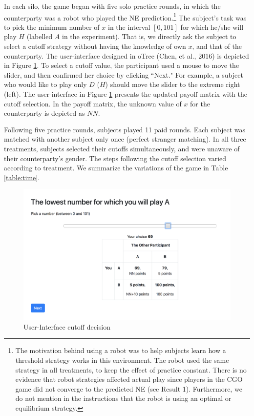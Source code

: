 \documentclass[12pt, letterpaper]{article}
\theoremstyle{plain}
\begin{document}
In each silo, the game began with five solo practice rounds, in which the counterparty was a robot who played the NE prediction.\footnote{The motivation behind using a robot was to help subjects learn how a threshold strategy works in this environment. The robot used the same strategy in all treatments, to keep the effect of practice constant. There is no evidence that robot strategies affected actual play since players in the CGO game did not converge to the predicted NE (see Result 1). Furthermore, we do not mention in the instructions that the robot is using an optimal or equilibrium strategy.} The subject's task was to pick the minimum number of $x$ in the interval $[0,101]$ for which he/she will play $H$ (labelled $A$ in the experiment). That is, we directly ask the subject to select a cutoff strategy without having the knowledge of own $x$, and that of the counterparty. The user-interface designed in oTree (Chen, et al., 2016) is depicted in Figure \ref{fig:ui}. To select a cutoff value, the participant used a mouse to move the slider, and then confirmed her choice by clicking ``Next." For example, a subject who would like to play only $D$ ($H$) should move the slider to the extreme right (left). The user-interface in Figure \ref{fig:ui} presents the updated payoff matrix with the cutoff selection. In the payoff matrix, the unknown value of $x$ for the counterparty is depicted as $NN$.

Following five practice rounds, subjects played 11 paid rounds. Each subject was matched with another subject only once (perfect stranger matching).  In all three treatments, subjects selected their cutoffs simultaneously, and were unaware of their counterparty's gender. The steps following the cutoff selection varied according to treatment. We summarize the variations of the game in Table \ref{table:time}. 

\begin{center}
\begin{figure}[ht]
\centering{}%
\includegraphics[scale=0.3]{cutoffen.png}%
\caption{User-Interface cutoff decision} 
\label{fig:ui}
\end{figure}
\end{center}
\end{document}
